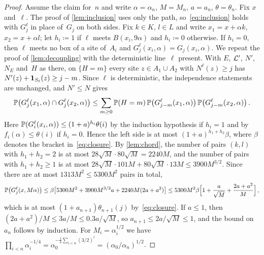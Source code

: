 \documentclass[11pt,letterpaper]{article}
\newcommand{\Lp}{\cL'}
\begin{document}
\begin{proof}
Assume the claim for~$n$ and write $\alpha=\alpha_n$, $M=M_n$, $a=a_n$, $\theta=\theta_n$. Fix $x$ and~$\ell$. The proof of \cref{lem:inclusion} uses only the path, so~\eqref{eq:inclusion} holds with $G^\ell_j$ in place of~$G_j$ on both sides. Fix $k\in K$, $l\in L$ and write $x_1=x+\alpha k$, $x_2=x+\alpha l$; let $h_i\coloneqq1$ if $\ell$ meets $B(x_i,9\alpha)$ and $h_i\coloneqq0$ otherwise. If $h_i=0$, then $\ell$ meets no box of a site of~$A_i$ and $G^\ell_j(x_i,\alpha)=G_j(x_i,\alpha)$. We repeat the proof of \cref{lem:decoupling} with the deterministic line~$\ell$ present. With $E$, $\Lp$, $N'$, $N_E$ and~$H$ as there, on $\{H=m\}$ every site $z\in A_1\cup A_2$ with $N^\ell(z)\ge j$ has $N'(z)+\1_{S_\ell}(z)\ge j-m$. Since $\ell$ is deterministic, the independence statements are unchanged, and $N'\le N$ gives
\begin{equation*}
  \P\bigl(G^\ell_j(x_1,\alpha)\cap G^\ell_j(x_2,\alpha)\bigr)\le\sum_{m\ge0}\P(H=m)\,\P\bigl(G^\ell_{j-m}(x_1,\alpha)\bigr)\,\P\bigl(G^\ell_{j-m}(x_2,\alpha)\bigr)\,.
\end{equation*}
Here $\P(G^\ell_{i}(x_i,\alpha))\le(1+a)^{h_i}\theta(i)$ by the induction hypothesis if $h_i=1$ and by $f_i(\alpha)\le\theta(i)$ if $h_i=0$. Hence the left side is at most $(1+a)^{h_1+h_2}\beta$, where $\beta$ denotes the bracket in~\eqref{eq:closure}. By \cref{lem:chord}, the number of pairs $(k,l)$ with $h_1+h_2=2$ is at most $28\sqrt M\cdot80\sqrt M=2240M$, and the number of pairs with $h_1+h_2\ge1$ is at most $28\sqrt M\cdot101M+80\sqrt M\cdot13M\le3900M^{3/2}$. Since there are at most $1313M^2\le5300M^2$ pairs in total,
\begin{equation*}
  \P\bigl(G^\ell_j(x,M\alpha)\bigr)\le\beta\bigl[5300M^2+3900M^{3/2}a+2240M(2a+a^2)\bigr]\le5300M^2\beta\Bigl[1+\frac{a}{\sqrt M}+\frac{2a+a^2}{M}\Bigr]\,,
\end{equation*}
which is at most $(1+a_{n+1})\theta_{n+1}(j)$ by~\eqref{eq:closure}. If $a\le1$, then $(2a+a^2)/M\le3a/M\le0.3a/\sqrt M$, so $a_{n+1}\le2a/\sqrt M\le1$, and the bound on~$a_n$ follows by induction. For $M_i=\alpha_i^{1/2}$ we have $\prod_{i<n}\alpha_i^{-1/4}=\alpha_0^{-\frac14\sum_{i<n}(3/2)^i}=(\alpha_0/\alpha_n)^{1/2}$.
\end{proof}
\end{document}

